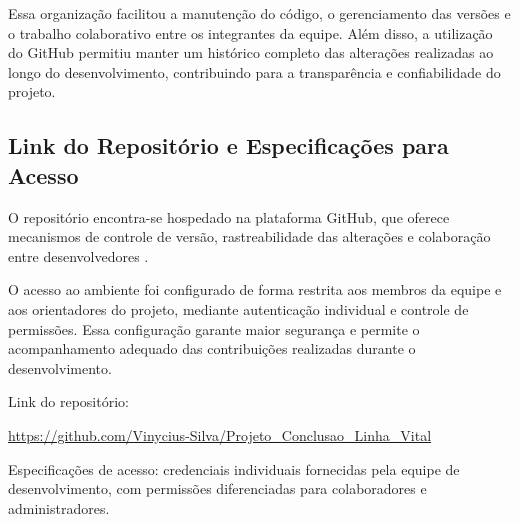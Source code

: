 Essa organização facilitou a manutenção do código, o gerenciamento das versões e o trabalho colaborativo entre os integrantes da equipe. Além disso, a utilização do GitHub permitiu manter um histórico completo das alterações realizadas ao longo do desenvolvimento, contribuindo para a transparência e confiabilidade do projeto.

\subsection{Link do Repositório e Especificações para Acesso}

O repositório encontra-se hospedado na plataforma GitHub, que oferece mecanismos de controle de versão, rastreabilidade das alterações e colaboração entre desenvolvedores \cite{githubdocs2026}.

O acesso ao ambiente foi configurado de forma restrita aos membros da equipe e aos orientadores do projeto, mediante autenticação individual e controle de permissões. Essa configuração garante maior segurança e permite o acompanhamento adequado das contribuições realizadas durante o desenvolvimento.

Link do repositório:

\begin{center}
\url{https://github.com/Vinycius-Silva/Projeto_Conclusao_Linha_Vital}
\end{center}

Especificações de acesso: credenciais individuais fornecidas pela equipe de desenvolvimento, com permissões diferenciadas para colaboradores e administradores.